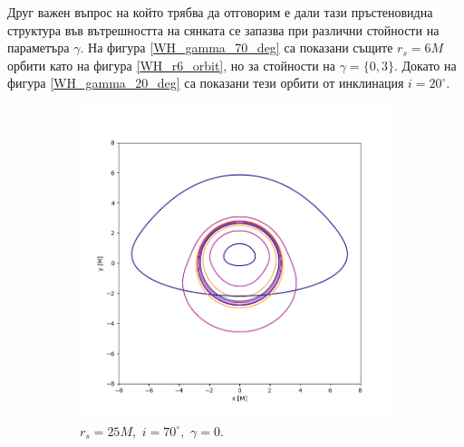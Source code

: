 Друг важен въпрос на който трябва да отговорим е дали тази пръстеновидна структура във вътрешността на сянката се запазва при различни стойности на параметъра $\gamma$. На фигура \ref{WH_gamma_70_deg} са показани същите $r_s = 6M$ орбити като на фигура \ref{WH_r6_orbit}, но за стойности на $\gamma =\{0, 3\}$. Докато на фигура \ref{WH_gamma_20_deg} са показани тези орбити от инклинация $i = 20^\circ$.
\newpage
\begin{figure}[!htb]
	\centering
	\begin{subfigure}{6cm}
		\hspace{-1.2cm}
		\includegraphics[scale = 0.35]{Wh_70_deg_r6_gamma_0.png}
		\caption{$r_s = 25M,\,\, i = 70^\circ,\,\,\gamma = 0$.} 
	\end{subfigure}\,\,\,
	\begin{subfigure}{6cm}
		\hspace{-0.7cm}

\end{subfigure}
\end{figure}
